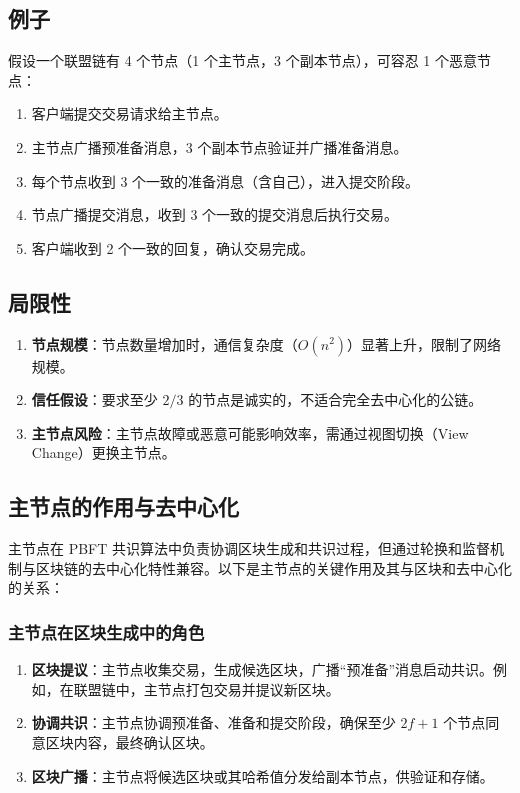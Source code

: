 \documentclass[12pt]{ctexart}
\begin{document}
\subsection{例子}
假设一个联盟链有 4 个节点（1 个主节点，3 个副本节点），可容忍 1 个恶意节点：
\begin{enumerate}
    \item 客户端提交交易请求给主节点。
    \item 主节点广播预准备消息，3 个副本节点验证并广播准备消息。
    \item 每个节点收到 3 个一致的准备消息（含自己），进入提交阶段。
    \item 节点广播提交消息，收到 3 个一致的提交消息后执行交易。
    \item 客户端收到 2 个一致的回复，确认交易完成。
\end{enumerate}

\subsection{局限性}
\begin{enumerate}
    \item \textbf{节点规模}：节点数量增加时，通信复杂度（\( O(n^2) \)）显著上升，限制了网络规模。
    \item \textbf{信任假设}：要求至少 \( 2/3 \) 的节点是诚实的，不适合完全去中心化的公链。
    \item \textbf{主节点风险}：主节点故障或恶意可能影响效率，需通过视图切换（View Change）更换主节点。
\end{enumerate}

\subsection{主节点的作用与去中心化}
主节点在 PBFT 共识算法中负责协调区块生成和共识过程，但通过轮换和监督机制与区块链的去中心化特性兼容。以下是主节点的关键作用及其与区块和去中心化的关系：

\subsubsection{主节点在区块生成中的角色}
\begin{enumerate}
    \item \textbf{区块提议}：主节点收集交易，生成候选区块，广播“预准备”消息启动共识。例如，在联盟链中，主节点打包交易并提议新区块。
    \item \textbf{协调共识}：主节点协调预准备、准备和提交阶段，确保至少 \( 2f + 1 \) 个节点同意区块内容，最终确认区块。
    \item \textbf{区块广播}：主节点将候选区块或其哈希值分发给副本节点，供验证和存储。
\end{enumerate}
\end{document}
